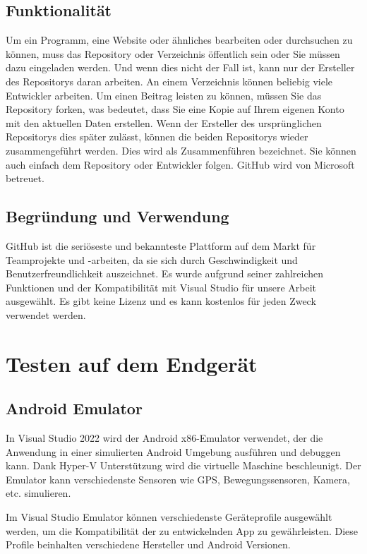 \subsection*{Funktionalität}
Um ein Programm, eine Website oder ähnliches bearbeiten oder durchsuchen zu können, 
muss das Repository oder Verzeichnis öffentlich sein oder Sie müssen dazu eingeladen 
werden. Und wenn dies nicht der Fall ist, kann nur der Ersteller des Repositorys 
daran arbeiten. An einem Verzeichnis können beliebig viele Entwickler arbeiten. 
Um einen Beitrag leisten zu können, müssen Sie das Repository forken, was bedeutet, 
dass Sie eine Kopie auf Ihrem eigenen Konto mit den aktuellen Daten erstellen. 
Wenn der Ersteller des ursprünglichen Repositorys dies später zulässt, können die 
beiden Repositorys wieder zusammengeführt werden. Dies wird als Zusammenführen 
bezeichnet. Sie können auch einfach dem Repository oder Entwickler folgen. 
GitHub wird von Microsoft betreuet.
\subsection*{Begründung und Verwendung}
GitHub ist die seriöseste und bekannteste Plattform auf dem Markt für Teamprojekte 
und -arbeiten, da sie sich durch Geschwindigkeit und Benutzerfreundlichkeit 
auszeichnet. Es wurde aufgrund seiner zahlreichen Funktionen und der Kompatibilität 
mit Visual Studio für unsere Arbeit ausgewählt. Es gibt keine Lizenz und es kann 
kostenlos für jeden Zweck verwendet werden.
\newpage

\newpage
\section{Testen auf dem Endgerät}
\subsection{Android Emulator}
\cite{AndroidEmulator}
In Visual Studio 2022 wird der Android x86-Emulator verwendet, der die Anwendung in einer simulierten Android Umgebung ausführen 
und debuggen kann. Dank Hyper-V Unterstützung wird die virtuelle Maschine beschleunigt. 
Der Emulator kann verschiedenste Sensoren wie GPS, Bewegungssensoren, Kamera, etc. simulieren.

Im Visual Studio Emulator können verschiedenste Geräteprofile ausgewählt werden, um die Kompatibilität der zu entwickelnden App zu 
gewährleisten. Diese Profile beinhalten verschiedene Hersteller und Android Versionen.


